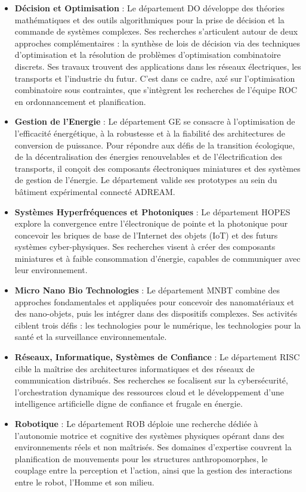 \begin{itemize}
    \item
    \textbf{Décision et Optimisation} : Le département DO développe des théories mathématiques et des outils algorithmiques pour la prise de décision et la commande de systèmes complexes. Ses recherches s'articulent autour de deux approches complémentaires : la synthèse de lois de décision via des techniques d'optimisation et la résolution de problèmes d'optimisation combinatoire discrets. Ses travaux trouvent des applications dans les réseaux électriques, les transports et l'industrie du futur. C'est dans ce cadre, axé sur l'optimisation combinatoire sous contraintes, que s'intègrent les recherches de l'équipe ROC en ordonnancement et planification.

    \item
    \textbf{Gestion de l'Energie} : Le département GE se consacre à l'optimisation de l'efficacité énergétique, à la robustesse et à la fiabilité des architectures de conversion de puissance. Pour répondre aux défis de la transition écologique, de la décentralisation des énergies renouvelables et de l'électrification des transports, il conçoit des composants électroniques miniatures et des systèmes de gestion de l'énergie. Le département valide ses prototypes au sein du bâtiment expérimental connecté ADREAM.

    \item
    \textbf{Systèmes Hyperfréquences et Photoniques} : Le département HOPES explore la convergence entre l'électronique de pointe et la photonique pour concevoir les briques de base de l'Internet des objets (IoT) et des futurs systèmes cyber-physiques. Ses recherches visent à créer des composants miniatures et à faible consommation d'énergie, capables de communiquer avec leur environnement.

    \item
    \textbf{Micro Nano Bio Technologies} : Le département MNBT combine des approches fondamentales et appliquées pour concevoir des nanomatériaux et des nano-objets, puis les intégrer dans des dispositifs complexes. Ses activités ciblent trois défis : les technologies pour le numérique, les technologies pour la santé et la surveillance environnementale.

    \item
    \textbf{Réseaux, Informatique, Systèmes de Confiance} : Le département RISC cible la maîtrise des architectures informatiques et des réseaux de communication distribués. Ses recherches se focalisent sur la cybersécurité, l'orchestration dynamique des ressources cloud et le développement d'une intelligence artificielle digne de confiance et frugale en énergie.

    \item
    \textbf{Robotique} : Le département ROB déploie une recherche dédiée à l'autonomie motrice et cognitive des systèmes physiques opérant dans des environnements réels et non maîtrisés. Ses domaines d'expertise couvrent la planification de mouvements pour les structures anthropomorphes, le couplage entre la perception et l'action, ainsi que la gestion des interactions entre le robot, l'Homme et son milieu.
\end{itemize}

